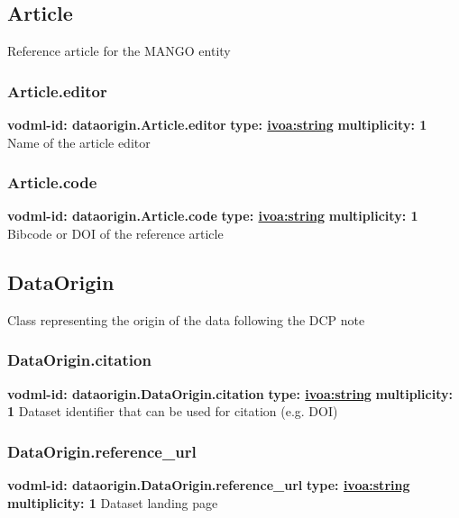   \subsection{Article}
    \label{sect:dataorigin.Article}
    Reference article for the MANGO entity

    \subsubsection{Article.editor}
    \textbf{vodml-id: dataorigin.Article.editor} \newline
    \textbf{type: \hyperref[sect:ivoa]{ivoa:string}} \newline
    \textbf{multiplicity: 1} \newline
    Name of the article editor

    \subsubsection{Article.code}
    \textbf{vodml-id: dataorigin.Article.code} \newline
    \textbf{type: \hyperref[sect:ivoa]{ivoa:string}} \newline
    \textbf{multiplicity: 1} \newline
    Bibcode or DOI of the reference article

  \subsection{DataOrigin}
    \label{sect:dataorigin.DataOrigin}
    Class representing the origin of the data following the DCP note

    \subsubsection{DataOrigin.citation}
    \textbf{vodml-id: dataorigin.DataOrigin.citation} \newline
    \textbf{type: \hyperref[sect:ivoa]{ivoa:string}} \newline
    \textbf{multiplicity: 1} \newline
    Dataset identifier that can be used for citation (e.g. DOI)

    \subsubsection{DataOrigin.reference\_url}
    \textbf{vodml-id: dataorigin.DataOrigin.reference\_url} \newline
    \textbf{type: \hyperref[sect:ivoa]{ivoa:string}} \newline
    \textbf{multiplicity: 1} \newline
    Dataset landing page

